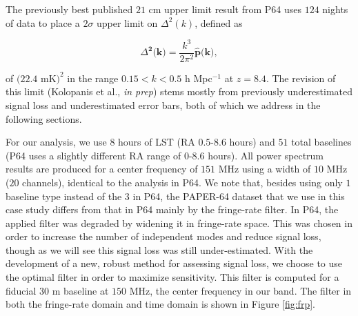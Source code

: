 \documentclass[preprint2,numberedappendix,tighten]{aastex6}  %
\begin{document}
The previously best published $21$ cm upper limit result from P64 uses $124$ nights of data to place a $2\sigma$ upper limit 
on $\Delta^{2}(k)$, defined as

\begin{equation}
\Delta^{\textbf{2}}\textbf{(k)} = \frac{k^{3}}{2\pi^{2}}\hat{\textbf{p}}\textbf{(k)},
\end{equation}

\noindent of $(22.4$ mK$)^{2}$ in the range $0.15 < k < 0.5$ h Mpc$^{-1}$ at $z = 8.4$. The revision of this limit (Kolopanis et al., \textit{in prep}) stems mostly from previously underestimated signal loss and underestimated error bars, both of which we 
address in the following sections. 

For our analysis, we use $8$ hours of LST (RA $0.5$-$8.6$ hours) and $51$ total baselines (P64 uses a slightly different RA 
range of $0$-$8.6$ hours). All power spectrum results are produced for a center frequency of $151$ MHz using a width of $10$ 
MHz ($20$ channels), identical to the analysis in P64. We note that, besides using only $1$ baseline type instead of the $3$ in 
P64, the PAPER-64 dataset that we use in this case study differs from that in P64 mainly by the fringe-rate filter. In P64, the 
applied filter was degraded by widening it in fringe-rate space. This was chosen in order to increase the number of independent 
modes and reduce signal loss, though as we will see this signal loss was still under-estimated. With the development of a new, 
robust method for assessing signal loss, we choose to use the optimal filter in order to maximize sensitivity. This filter is 
computed for a fiducial $30$ m baseline at $150$ MHz, the center frequency in our band. The filter in both the fringe-rate 
domain and time domain is shown in Figure \ref{fig:frp}.
\end{document}
